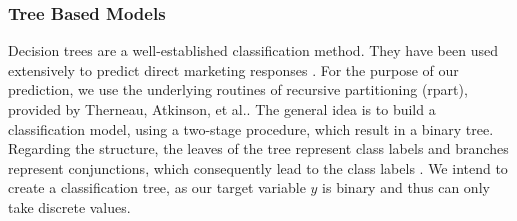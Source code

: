 \documentclass[12pt]{article}
\begin{document}
\newpage
\subsubsection{Tree Based Models}
Decision trees are a well-established classification method. They have been used extensively to predict direct marketing responses \cite{HAUGHTON199742}. For the purpose of our prediction, we use the underlying routines of recursive partitioning (rpart), provided by Therneau, Atkinson, et al.. The general idea is to build a classification model, using a two-stage procedure, which result in a binary tree. Regarding the structure, the leaves of the tree represent class labels and branches represent conjunctions, which consequently lead to the class labels \cite{therneau1997introduction}. We intend to create a classification tree, as our target variable $y$ is binary and thus can only take discrete values. \\
\end{document}

